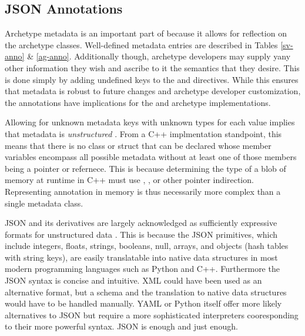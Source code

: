 \subsection{JSON Annotations}

Archetype metadata is an important part of \cyclus because it allows for 
reflection on the archetype classes. Well-defined metadata entries are 
described in Tables \ref{sv-anno} \& \ref{ag-anno}. 
Additionally though, archetype developers may supply 
yany other information they wish and ascribe to it the semantics that they desire.
This is done simply by adding undefined keys to the  and
 \cycpp directives.
While this ensures that metadata is robust to future changes and archetype developer
customization, the annotations have implications for the \cyclus and archetype 
implementations.

Allowing for unknown metadata keys with unknown types for each value implies that 
metadata is \emph{unstructured} \cite{feldman2007text}. From a C++ implmentation 
standpoint, this means that there is no class or struct that can be declared whose
member variables encompass all possible metadata without at least one of those
members being a pointer or refernece. This is because determining the type 
of a blob of memory at runtime in C++ must use , , 
or other pointer indirection. Representing annotation in memory is thus 
necessarily more complex than a single metadata class.

JSON and its derivatives are largely acknowledged as sufficiently expressive 
formats for unstructured data \cite{moniruzzaman2013nosql}. This is because the
JSON primitives, which include integers, floats, strings, booleans, null, arrays, 
and objects (hash tables with string keys), are easily translatable into native
data structures in most modern programming languages such as Python and C++. 
Furthermore the JSON syntax is concise and intuitive. XML could have been used 
as an alternative format, but a schema and the translation to native data structures 
would have to be handled manually. YAML \cite{ben2009yaml} or Python itself offer 
more likely  alternatives to JSON but require a more sophisticated interpreters 
cooresponding to their more powerful syntax. JSON is enough and just enough.

